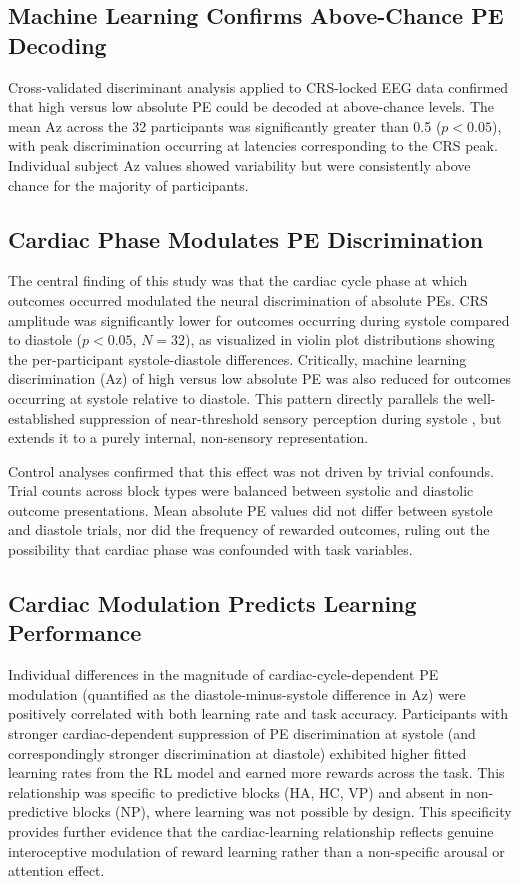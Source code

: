 \documentclass[12pt]{article}
\begin{document}
\subsection{Machine Learning Confirms Above-Chance PE Decoding}

Cross-validated discriminant analysis applied to CRS-locked EEG data confirmed that high versus low absolute PE could be decoded at above-chance levels. The mean Az across the 32 participants was significantly greater than 0.5 ($p < 0.05$), with peak discrimination occurring at latencies corresponding to the CRS peak. Individual subject Az values showed variability but were consistently above chance for the majority of participants.

\subsection{Cardiac Phase Modulates PE Discrimination}

The central finding of this study was that the cardiac cycle phase at which outcomes occurred modulated the neural discrimination of absolute PEs. CRS amplitude was significantly lower for outcomes occurring during systole compared to diastole ($p < 0.05$, $N = 32$), as visualized in violin plot distributions showing the per-participant systole-diastole differences. Critically, machine learning discrimination (Az) of high versus low absolute PE was also reduced for outcomes occurring at systole relative to diastole. This pattern directly parallels the well-established suppression of near-threshold sensory perception during systole \citep{salomon2016brain, al2020cardiac}, but extends it to a purely internal, non-sensory representation.

Control analyses confirmed that this effect was not driven by trivial confounds. Trial counts across block types were balanced between systolic and diastolic outcome presentations. Mean absolute PE values did not differ between systole and diastole trials, nor did the frequency of rewarded outcomes, ruling out the possibility that cardiac phase was confounded with task variables.

\subsection{Cardiac Modulation Predicts Learning Performance}

Individual differences in the magnitude of cardiac-cycle-dependent PE modulation (quantified as the diastole-minus-systole difference in Az) were positively correlated with both learning rate and task accuracy. Participants with stronger cardiac-dependent suppression of PE discrimination at systole (and correspondingly stronger discrimination at diastole) exhibited higher fitted learning rates from the RL model and earned more rewards across the task. This relationship was specific to predictive blocks (HA, HC, VP) and absent in non-predictive blocks (NP), where learning was not possible by design. This specificity provides further evidence that the cardiac-learning relationship reflects genuine interoceptive modulation of reward learning rather than a non-specific arousal or attention effect.
\end{document}
